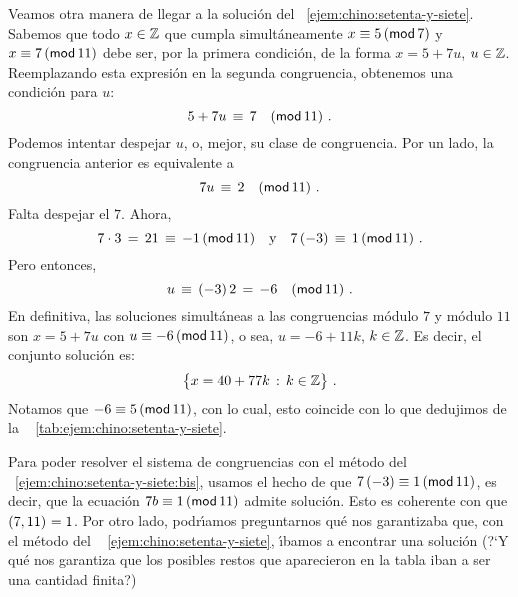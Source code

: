 \begin{ejemChino}\label{ejem:chino:setenta-y-siete:bis}
	Veamos otra manera de llegar a la soluci\'on del
	\ejemname~\ref{ejem:chino:setenta-y-siete}.
	Sabemos que todo $x\in\Enteros$ que cumpla simult\'aneamente
	$x\equiv 5\tmodulo[7]$ y $x\equiv 7\tmodulo[11]$ debe ser,
	por la primera condici\'on, de la forma
	$x=5+7u$, $u\in\Enteros$. Reemplazando esta expresi\'on en la
	segunda congruencia, obtenemos una condici\'on para $u$:
	\begin{displaymath}
		5+7u\,\equiv\,7\modulo[11]
		\dispstop
	\end{displaymath}
	Podemos intentar despejar $u$, o, mejor, su clase de congruencia.
	Por un lado, la congruencia anterior es equivalente a
	\begin{displaymath}
		7u\,\equiv\,2\modulo[11]
		\dispstop
	\end{displaymath}
	Falta despejar el $7$. Ahora,
	\begin{displaymath}
		7\cdot 3\,=\,21\,\equiv\,-1\tmodulo[11]\dispand
		7\,(-3)\,\equiv\,1\tmodulo[11]
		\dispstop
	\end{displaymath}
	Pero entonces,
	\begin{displaymath}
		u\,\equiv\,(-3)\,2\,=\,-6
		\modulo[11]
		\dispstop
	\end{displaymath}
	En definitiva, las soluciones simult\'aneas a las congruencias
	m\'odulo $7$ y m\'odulo $11$ son
	$x=5+7u$ con $u\equiv -6\tmodulo[11]$, o sea, $u=-6+11k$,
	$k\in\Enteros$. Es decir, el conjunto soluci\'on es:
	\begin{displaymath}
		\big\{x=40+77k\,:\,k\in\Enteros\big\}
		\dispstop
	\end{displaymath}
	Notamos que $-6\equiv 5\tmodulo[11]$, con lo cual, esto
	coincide con lo que dedujimos de la \tablename~%
	\ref{tab:ejem:chino:setenta-y-siete}.
\end{ejemChino}

\begin{obsChino}\label{obs:chino:setenta-y-siete}
	Para poder resolver el sistema de congruencias con el
	m\'etodo del \ejemname~\ref{ejem:chino:setenta-y-siete:bis},
	usamos el hecho de que $7\,(-3)\equiv 1\tmodulo[11]$,
	es decir, que la ecuaci\'on $7b\equiv 1\tmodulo[11]$ admite
	soluci\'on. Esto es coherente con que $\mcd{7,11}=1$.
	Por otro lado, podr\'{\i}amos preguntarnos qu\'e nos
	garantizaba que, con el m\'etodo del \ejemname~%
	\ref{ejem:chino:setenta-y-siete}, \'{\i}bamos a encontrar
	una soluci\'on
	(?`Y qu\'e nos garantiza que los posibles restos que
	aparecieron en la tabla iban a ser una cantidad finita?)
\end{obsChino}

